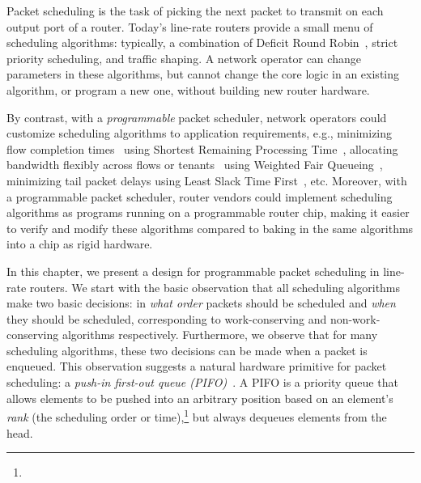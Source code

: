 
Packet scheduling is the task of picking the next packet to transmit on each
output port of a router.  Today's line-rate routers provide a small menu of
scheduling algorithms: typically, a combination of Deficit Round
Robin~\cite{drr}, strict priority scheduling, and traffic shaping. A network
operator can change parameters in these algorithms, but cannot change the core
logic in an existing algorithm, or program a new one, without building new
router hardware.

By contrast, with a {\em programmable} packet scheduler, network operators
could customize scheduling algorithms to application requirements, e.g.,
minimizing flow completion times~\cite{pFabric} using Shortest Remaining
Processing Time~\cite{srpt}, allocating bandwidth flexibly across flows or
tenants~\cite{eyeq, faircloud} using Weighted Fair Queueing~\cite{wfq},
minimizing tail packet delays using Least Slack Time First~\cite{lstf}, etc.
Moreover, with a programmable packet scheduler, router vendors could implement
scheduling algorithms as programs running on a programmable router chip, making
it easier to verify and modify these algorithms compared to baking in the same
algorithms into a chip as rigid hardware.

In this chapter, we present a design for programmable packet scheduling in
line-rate routers. We start with the basic observation that all scheduling
algorithms make two basic decisions: in {\em what order} packets should be
scheduled and {\em when} they should be scheduled, corresponding to
work-conserving and non-work-conserving algorithms respectively.  Furthermore,
we observe that for many scheduling algorithms, these two decisions can be made
when a packet is enqueued. 
This observation suggests a natural hardware primitive for packet scheduling: a
{\em push-in first-out queue (PIFO)}~\cite{pifo}. A PIFO is a priority queue
that allows elements to be pushed into an arbitrary position based on an
element's {\em rank} (the scheduling order or time),\footnote{} but always
dequeues elements from the head.

